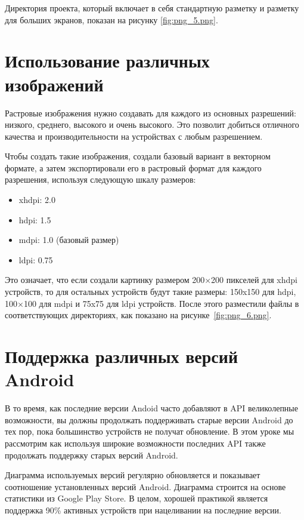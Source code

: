 Директория проекта, который включает в себя стандартную разметку и разметку
для больших экранов, показан на рисунку \ref{fig:png_5.png}.

\section{Использование различных изображений}
Растровые изображения нужно создавать для каждого из основных
разрешений: низкого, среднего, высокого и очень высокого.
Это позволит
добиться отличного качества и производительности на устройствах с любым
разрешением.\par
Чтобы создать такие изображения, создали базовый вариант в векторном
формате, а затем экспортировали его в растровый формат для каждого
разрешения, используя следующую шкалу размеров:

\begin{itemize}
	\item xhdpi: 2.0
	\item hdpi: 1.5
	\item mdpi: 1.0 (базовый размер)
	\item ldpi: 0.75
\end{itemize}

Это означает, что если создали картинку размером 200×200 пикселей для
xhdpi устройств, то для остальных устройств будут такие размеры: 150x150
для hdpi, 100×100 для mdpi и 75x75 для ldpi устройств.
После этого разместили файлы в соответствующих директориях, как показано
на рисунке~\ref{fig:png_6.png}.

\section{Поддержка различных версий Android}
В то время, как последние версии Andoid часто добавляют в API
великолепные возможности, вы должны продолжать поддерживать старые
версии Android до тех пор, пока большинство устройств не получат
обновление.
В этом уроке мы рассмотрим как используя широкие
возможности последних API также продолжать поддержку старых версий
Android.\par
Диаграмма используемых версий регулярно обновляется и показывает
соотношение установленных версий Android.
Диаграмма строится на основе
статистики из Google Play Store.
В целом, хорошей практикой является
поддержка 90\% активных устройств при нацеливании на последние версии.

